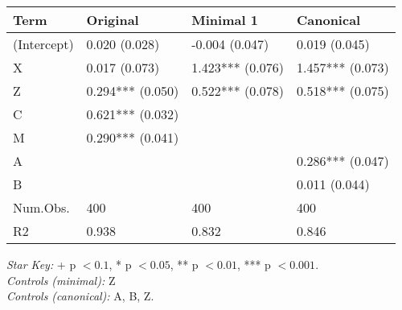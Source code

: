 \begin{center}
\begin{longtable}{@{}p{\dimexpr(\textwidth - 6\tabcolsep)/4\relax}p{\dimexpr(\textwidth - 6\tabcolsep)/4\relax}p{\dimexpr(\textwidth - 6\tabcolsep)/4\relax}p{\dimexpr(\textwidth - 6\tabcolsep)/4\relax}@{}}
\toprule
Term & Original & Minimal 1 & Canonical \\
\midrule
\textnormal{(Intercept)} & 0.020 (0.028) & -0.004 (0.047) & 0.019 (0.045) \\
\textnormal{X} & 0.017 (0.073) & 1.423*** (0.076) & 1.457*** (0.073) \\
\textnormal{Z} & 0.294*** (0.050) & 0.522*** (0.078) & 0.518*** (0.075) \\
\textnormal{C} & 0.621*** (0.032) &  &  \\
\textnormal{M} & 0.290*** (0.041) &  &  \\
\textnormal{A} &  &  & 0.286*** (0.047) \\
\textnormal{B} &  &  & 0.011 (0.044) \\
\textnormal{Num.Obs.} & 400 & 400 & 400 \\
\textnormal{R2} & 0.938 & 0.832 & 0.846 \\
\bottomrule
\end{longtable}
\endgroup
\end{center}
{\footnotesize \emph{Star Key:} + p $< 0.1$, * p $< 0.05$, ** p $< 0.01$, *** p $< 0.001$.\\
\hspace*{1.5em}\textit{Controls (minimal):} {Z}\\
\hspace*{1.5em}\textit{Controls (canonical):} {A, B, Z}.}
\endgroup

